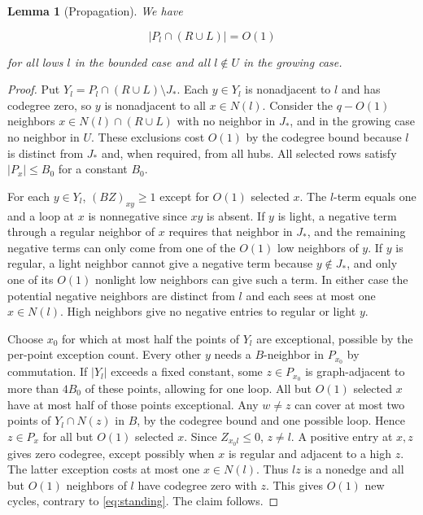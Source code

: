 \documentclass[11pt,reqno]{amsart}
\newtheorem{lemma}[theorem]{Lemma}
\theoremstyle{definition}
\theoremstyle{remark}
\numberwithin{equation}{section}
\begin{document}
\begin{lemma}[Propagation]\label{lem:propagation}
We have

\begin{equation}\label{eq:propagation}
|P_l\cap(R\cup L)|=O(1)
\end{equation}

for all lows \(l\) in the bounded case and all \(l\notin U\) in the growing case. \end{lemma}
\begin{proof}
Put \(Y_l=P_l\cap(R\cup L)\setminus J_*\). Each \(y\in Y_l\) is nonadjacent to \(l\) and has codegree zero, so \(y\) is nonadjacent to all \(x\in N(l)\). Consider the \(q-O(1)\) neighbors \(x\in N(l)\cap(R\cup L)\) with no neighbor in \(J_*\), and in the growing case no neighbor in \(U\). These exclusions cost \(O(1)\) by the codegree bound because \(l\) is distinct from \(J_*\) and, when required, from all hubs. All selected rows satisfy \(|P_x|\le B_0\) for a constant \(B_0\).

For each \(y\in Y_l\), \((BZ)_{xy}\ge1\) except for \(O(1)\) selected \(x\). The \(l\)-term equals one and a loop at \(x\) is nonnegative since \(xy\) is absent. If \(y\) is light, a negative term through a regular neighbor of \(x\) requires that neighbor in \(J_*\), and the remaining negative terms can only come from one of the \(O(1)\) low neighbors of \(y\). If \(y\) is regular, a light neighbor cannot give a negative term because \(y\notin J_*\), and only one of its \(O(1)\) nonlight low neighbors can give such a term. In either case the potential negative neighbors are distinct from \(l\) and each sees at most one \(x\in N(l)\). High neighbors give no negative entries to regular or light \(y\).

Choose \(x_0\) for which at most half the points of \(Y_l\) are exceptional, possible by the per-point exception count. Every other \(y\) needs a \(B\)-neighbor in \(P_{x_0}\) by commutation. If \(|Y_l|\) exceeds a fixed constant, some \(z\in P_{x_0}\) is graph-adjacent to more than \(4B_0\) of these points, allowing for one loop. All but \(O(1)\) selected \(x\) have at most half of those points exceptional. Any \(w\ne z\) can cover at most two points of \(Y_l\cap N(z)\) in \(B\), by the codegree bound and one possible loop. Hence \(z\in P_x\) for all but \(O(1)\) selected \(x\). Since \(Z_{x_0l}\le0\), \(z\ne l\). A positive entry at \(x,z\) gives zero codegree, except possibly when \(x\) is regular and adjacent to a high \(z\). The latter exception costs at most one \(x\in N(l)\). Thus \(lz\) is a nonedge and all but \(O(1)\) neighbors of \(l\) have codegree zero with \(z\). This gives \(O(1)\) new cycles, contrary to \eqref{eq:standing}. The claim follows.
\end{proof}
\end{document}

